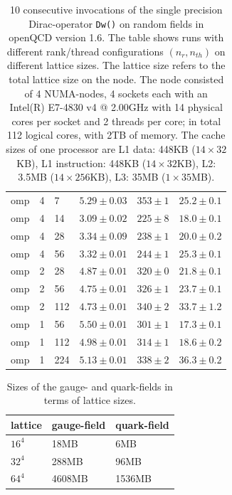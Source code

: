 \documentclass{article}
\theoremstyle{plain} %
\theoremstyle{convention} %
\theoremstyle{remark} %
\def\code#1{\texttt{#1}}
\numberwithin{equation}{section}
\begin{document}
\begin{table}
\begin{tabular}{ |p{1.5cm}||p{1cm}|p{1cm}|p{2cm}|p{2cm}|p{2cm}| }
        \hline
        omp & 4 & 7 & $5.29 \pm 0.03$ & $353 \pm 1$ & $25.2 \pm 0.1$ \\
        omp & 4 & 14 & $3.09 \pm 0.02$ & $225 \pm 8$ & $18.0 \pm 0.1$ \\
        omp & 4 & 28 & $3.34 \pm 0.09$ & $238 \pm 1$ & $20.0 \pm 0.2$ \\
        omp & 4 & 56 & $3.32 \pm 0.01$ & $244 \pm 1$ & $25.3 \pm 0.1$ \\
        \hline
        omp & 2 & 28 & $4.87 \pm 0.01$ & $320 \pm 0$ & $21.8 \pm 0.1$ \\
        omp & 2 & 56 & $4.75 \pm 0.01$ & $326 \pm 1$ & $23.7 \pm 0.1$ \\
        omp & 2 & 112 & $4.73 \pm 0.01$ & $340 \pm 2$ & $33.7 \pm 1.2$ \\
        \hline
        omp & 1 & 56 & $5.50 \pm 0.01$ & $301 \pm 1$ & $17.3 \pm 0.1$ \\
        omp & 1 & 112 & $4.98 \pm 0.01$ & $314 \pm 1$ & $18.6 \pm 0.2$ \\
        omp & 1 & 224 & $5.13 \pm 0.01$ & $338 \pm 2$ & $36.3 \pm 0.2$ \\
        \hline
    \end{tabular}
    \caption{\num{10} consecutive invocations of the single precision Dirac-operator \code{Dw()} on random fields in openQCD version 1.6. The table shows runs with different rank/thread configurations $(n_r, n_{th})$ on different lattice sizes. The lattice size refers to the total lattice size on the node. The node consisted of \num{4} NUMA-nodes, \num{4} sockets each with an Intel(R) E7-4830 v4 @ 2.00GHz with \num{14} physical cores per socket and \num{2} threads per core; in total \num{112} logical cores, with 2TB of memory. The cache sizes of one processor are L1 data: 448KB ($14 \times 32$KB), L1 instruction: 448KB ($14 \times 32$KB), L2: 3.5MB ($14 \times 256$KB), L3: 35MB ($1 \times 35$MB).}
    \label{tab:dop_omp_intel}
\end{table}

\begin{table}
\centering
    \begin{tabular}{ |p{1cm}|p{2cm}|p{2cm}| }
        \hline
        lattice & gauge-field & quark-field \\
        \hline
        $16^4$ & 18MB & 6MB \\
        $32^4$ & 288MB & 96MB \\
        $64^4$ & 4608MB & 1536MB \\
        \hline
    \end{tabular}
    \caption{Sizes of the gauge- and quark-fields in terms of lattice sizes.}
    \label{tab:lattice_sizes}
\end{table}
\end{document}
